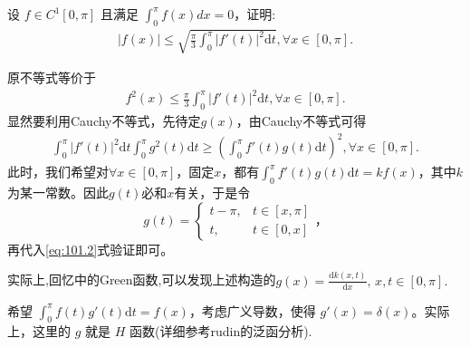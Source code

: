 \documentclass[../../main.tex]{subfiles}
\begin{document}
\begin{example}设 \(f \in C^1[0, \pi]\) 且满足 \(\int_{0}^{\pi} f(x) dx = 0\)，证明:
\begin{align*}
|f(x)|\leqslant \sqrt{\frac{\pi}{3}\int_0^{\pi}{|f\prime (t)|^2\mathrm{d}t}},\forall x\in [0,\pi ].
\end{align*} 
\end{example}
\begin{remark}
原不等式等价于
\begin{align*}
f^2(x) \leqslant \frac{\pi}{3}\int_0^{\pi} |f'(t)|^2\mathrm{d}t, \forall x\in [0, \pi].
\end{align*}
显然要利用Cauchy不等式，先待定\(g(x)\)，由Cauchy不等式可得
\begin{align}
\int_0^{\pi} |f'(t)|^2\mathrm{d}t\int_0^{\pi} g^2(t) \mathrm{d}t\geqslant \left( \int_0^{\pi} f'(t)g(t) \mathrm{d}t \right) ^2, \forall x\in [0, \pi]. \label{eq:101.2}
\end{align}
此时，我们希望对\(\forall x\in [0, \pi]\)，固定\(x\)，都有\(\int_0^{\pi} f'(t)g(t) \mathrm{d}t = kf(x)\)，其中\(k\)为某一常数。因此\(g(t)\)必和\(x\)有关，于是令
\[g(t) = 
\begin{cases}
t - \pi, & t\in [x, \pi]\\
t, & t\in [0, x]
\end{cases}，
\]
再代入\eqref{eq:101.2}式验证即可。

实际上,回忆中的Green函数,可以发现上述构造的$g(x)=\frac{\mathrm{d}k\left( x,t \right)}{\mathrm{d}x},\,x,t\in [0,\pi].$

希望 \(\int_0^{\pi} f(t)g'(t) \mathrm{d}t = f(x)\)，考虑广义导数，使得 \(g'(x) = \delta(x)\)。实际上，这里的 \(g\) 就是 \(H\) 函数(详细参考rudin的泛函分析).
\end{remark}
\end{document}
